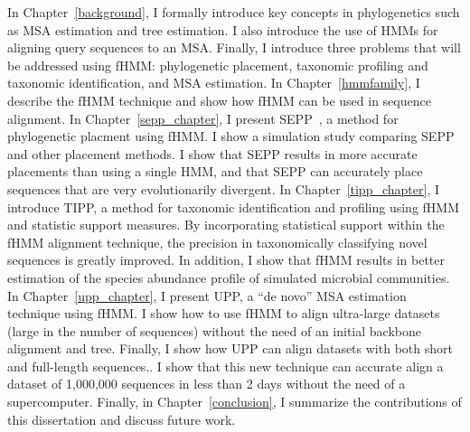 In Chapter~\ref{background}, I formally introduce key concepts in phylogenetics such as MSA estimation and tree estimation.  I also introduce the use of HMMs for aligning query sequences to an MSA.  Finally, I introduce three problems that will be addressed using  fHMM: phylogenetic placement, taxonomic profiling and taxonomic identification, and MSA estimation.  In Chapter~\ref{hmmfamily}, I describe the fHMM technique and show how fHMM can be used in sequence alignment.  In Chapter~\ref{sepp_chapter}, I present SEPP~\cite{todo}, a method for phylogenetic placment using fHMM.  I show a simulation study comparing SEPP and other placement methods.  I show that SEPP results in more accurate placements than using a single HMM, and that SEPP can accurately place sequences that are very evolutionarily divergent.  In Chapter~\ref{tipp_chapter}, I introduce TIPP, a method for taxonomic identification and profiling using fHMM and statistic support measures.  By incorporating statistical support within the fHMM alignment technique, the precision in taxonomically classifying novel sequences is greatly improved.  In addition, I show that fHMM results in better estimation of the species abundance profile of simulated microbial communities.  In Chapter~\ref{upp_chapter}, I present UPP, a ``de novo'' MSA estimation technique using fHMM.  I show how to use fHMM to align ultra-large datasets (large in the number of sequences) without the need of an initial backbone alignment and tree.  Finally, I show how UPP can align datasets with both short and full-length sequences..  I show that this new technique can accurate align a dataset of 1,000,000 sequences in less than 2 days without the need of a supercomputer.  Finally, in Chapter~\ref{conclusion}, I summarize the contributions of this dissertation and discuss future work.

